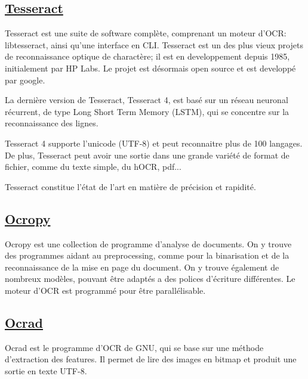 \subsection{\href{https://github.com/tesseract-ocr/tesseract}{Tesseract}}
Tesseract est une suite de software complète, comprenant un moteur d'OCR: libtesseract, ainsi qu'une interface en CLI. Tesseract est un des plus vieux projets de reconnaissance optique de charactère; il est en developpement depuis 1985, initialement par HP Labs. Le projet est désormais open source et est developpé par google. 

La dernière version de Tesseract, Tesseract 4, est basé sur un réseau neuronal récurrent, de type Long Short Term Memory (LSTM), qui se concentre sur la reconnaissance des lignes. 

Tesseract 4 supporte l'unicode (UTF-8) et peut reconnaitre plus de 100 langages. De plus, Tesseract peut avoir une sortie dans une grande variété de format de fichier, comme du texte simple, du hOCR, pdf... 

Tesseract constitue l'état de l'art en matière de précision et rapidité.

\subsection{\href{https://github.com/tmbdev/ocropy}{Ocropy}}
Ocropy est une collection de programme d'analyse de documents. On y trouve des programmes aidant au preprocessing, comme pour la binarisation et de la reconnaissance de la mise en page du document. On y trouve également de nombreux modèles, pouvant être adaptés a des polices d'écriture différentes. Le moteur d'OCR est programmé pour être parallélisable.

\subsection{\href{https://www.gnu.org/software/ocrad/}{Ocrad}}
Ocrad est le programme d'OCR de GNU, qui se base sur une méthode d'extraction des features. Il permet de lire des images en bitmap et produit une sortie en texte UTF-8.
